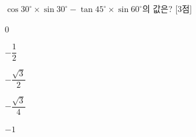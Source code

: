 $\cos 30^\circ\times\sin 30^\circ-\tan 45^\circ\times\sin 60^\circ$의 값은? \mbox{[3점]}
\begin{choices32}{\rule[-3ex]{0pt}{8ex}$0$}{\rule[-3ex]{0pt}{8ex}$-\dfrac{1}{2}$}{\rule[-3ex]{0pt}{8ex}$-\dfrac{\sqrt{3}}{2}$}{\rule[-3ex]{0pt}{8ex}$-\dfrac{\sqrt{3}}{4}$}{\rule[-3ex]{0pt}{8ex}$-1$}\end{choices32}
